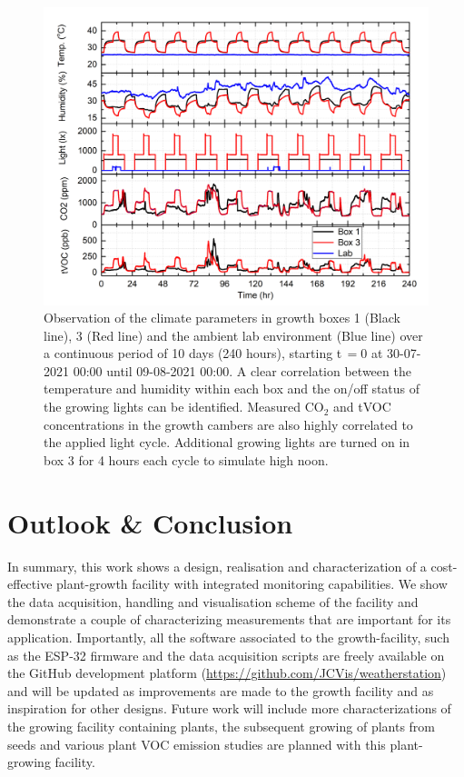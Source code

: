 \documentclass[reprint,superscriptaddress,aps,amsmath,amssymb]{revtex4-1}
\begin{document}
\begin{figure}
    \centering
    \includegraphics[width = 1.2\textwidth, angle = -90]{10d measurement.jpg}
    \caption{Observation of the climate parameters in growth boxes 1 (Black line), 3 (Red line) and the ambient lab environment (Blue line) over a continuous period of 10 days (240 hours), starting t\,$=0$ at 30-07-2021 00:00 until 09-08-2021 00:00. A clear correlation between the temperature and humidity within each box and the on/off status of the growing lights can be identified. Measured CO$_2$ and tVOC concentrations in the growth cambers are also highly correlated to the applied light cycle. Additional growing lights are turned on in box 3 for 4 hours each cycle to simulate high noon.}
    \label{fig:long observation}
\end{figure}
\newpage

\section{Outlook \& Conclusion}
In summary, this work shows a design, realisation and characterization of a cost-effective plant-growth facility with integrated monitoring capabilities. We show the data acquisition, handling and visualisation scheme of the facility and demonstrate a couple of characterizing measurements that are important for its application. Importantly, all the software associated to the growth-facility, such as the ESP-32 firmware and the data acquisition scripts are freely available on the GitHub development platform (\url{https://github.com/JCVis/weatherstation}) and will be updated as improvements are made to the growth facility and as inspiration for other designs. Future work will include more characterizations of the growing facility containing plants, the subsequent growing of plants from seeds and various plant VOC emission studies are planned with this plant-growing facility.
\end{document}
